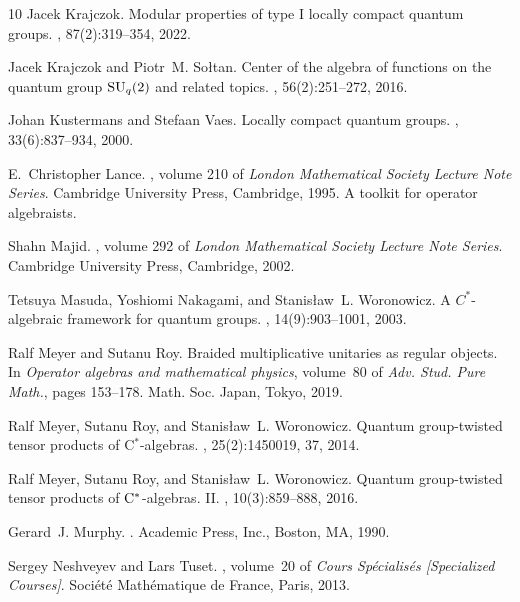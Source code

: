 \documentclass[12pt,reqno,a4paper]{amsart}
\theoremstyle{definition}
\numberwithin{equation}{section}
\begin{document}
\begin{thebibliography}{10}
Jacek Krajczok.
\newblock Modular properties of type {I} locally compact quantum groups.
, 87(2):319--354, 2022.

Jacek Krajczok and Piotr~M. So{\l}tan.
\newblock Center of the algebra of functions on the quantum group {${\rm
  SU}_q(2)$} and related topics.
, 56(2):251--272, 2016.

Johan Kustermans and Stefaan Vaes.
\newblock Locally compact quantum groups.
, 33(6):837--934, 2000.

E.~Christopher Lance.
, volume 210 of {\em London Mathematical
  Society Lecture Note Series}.
\newblock Cambridge University Press, Cambridge, 1995.
\newblock A toolkit for operator algebraists.

Shahn Majid.
, volume 292 of {\em London Mathematical
  Society Lecture Note Series}.
\newblock Cambridge University Press, Cambridge, 2002.

Tetsuya Masuda, Yoshiomi Nakagami, and Stanis{\l}aw~L. Woronowicz.
\newblock A {$C^\ast$}-algebraic framework for quantum groups.
, 14(9):903--1001, 2003.

Ralf Meyer and Sutanu Roy.
\newblock Braided multiplicative unitaries as regular objects.
\newblock In {\em Operator algebras and mathematical physics}, volume~80 of
  {\em Adv. Stud. Pure Math.}, pages 153--178. Math. Soc. Japan, Tokyo, 2019.

Ralf Meyer, Sutanu Roy, and Stanis{\l}aw~L. Woronowicz.
\newblock Quantum group-twisted tensor products of {C{$^*$}}-algebras.
, 25(2):1450019, 37, 2014.

Ralf Meyer, Sutanu Roy, and Stanis{\l}aw~L. Woronowicz.
\newblock Quantum group-twisted tensor products of {${\rm C}^*$}-algebras.
  {II}.
, 10(3):859--888, 2016.

Gerard~J. Murphy.
.
\newblock Academic Press, Inc., Boston, MA, 1990.

Sergey Neshveyev and Lars Tuset.
,
  volume~20 of {\em Cours Sp\'{e}cialis\'{e}s [Specialized Courses]}.
\newblock Soci\'{e}t\'{e} Math\'{e}matique de France, Paris, 2013.


\end{thebibliography}
\end{document}
